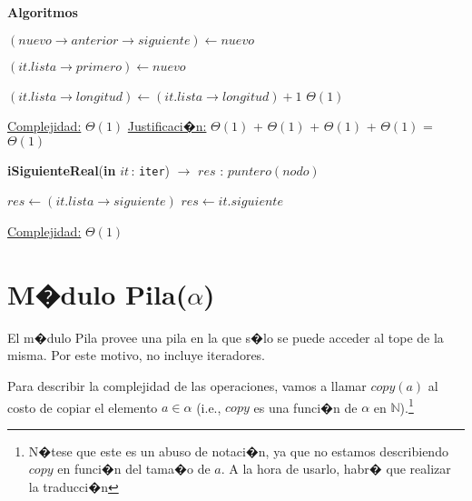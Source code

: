 \documentclass[a4paper,10pt]{article}
\let\TipoVariable=\texttt
\let\ModificadorArgumento=\textbf
\newcommand{\In}[2]{\ModificadorArgumento{in} \ensuremath{#1}\,: \TipoVariable{#2}\xspace}
\newenvironment{Algoritmos}{%
  \vspace*{2ex}%
  \noindent\textbf{\Large Algoritmos}%
  \vspace*{2ex}%
}{}
\begin{document}
\begin{Algoritmos}
\begin{algorithm}[H]
\begin{algorithmic}[1]
			\State $(nuevo\rightarrow anterior\rightarrow siguiente) \gets nuevo$ 
			
				\State $(it.lista\rightarrow primero) \gets nuevo$
			\EndIf
			
			\State $(it.lista\rightarrow longitud) \gets (it.lista\rightarrow longitud) + 1$	\Comment $\Theta(1)$

			\medskip
			\Statex \underline{Complejidad:} $\Theta(1)$
			\Statex \underline{Justificaci�n:} $\Theta(1)$ + $\Theta(1)$ + $\Theta(1)$ +  $\Theta(1)$ =  $\Theta(1)$
    	\end{algorithmic}
\end{algorithm}

	
\begin{algorithm}[H]
	\begin{algorithmic}
		\State \textbf{iSiguienteReal}(\In{it}{iter}) $\to$ $res$ : $puntero(nodo)$ 
			
			 
				\State $res \gets (it.lista\rightarrow siguiente)$
			\Else
				\State $res \gets it.siguiente$
			\EndIf
			
			\medskip
			\Statex \underline{Complejidad:} $\Theta(1)$
    	\end{algorithmic}
\end{algorithm}
%    
	
\end{Algoritmos}

\newpage

\section{M�dulo Pila($\alpha$)}

El m�dulo Pila provee una pila en la que s�lo se puede acceder al tope de la misma.  Por este motivo, no incluye iteradores.

Para describir la complejidad de las operaciones, vamos a llamar $copy(a)$ al costo de copiar el elemento $a \in \alpha$ (i.e., $copy$ es una funci�n de $\alpha$ en $\mathbb{N}$).\footnote{N�tese que este es un abuso de notaci�n, ya que no estamos describiendo $copy$ en funci�n del tama�o de $a$.  A la hora de usarlo, habr� que realizar la traducci�n}
\end{document}

